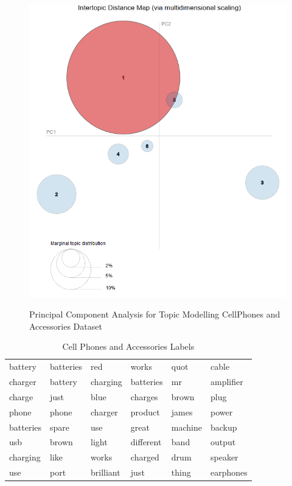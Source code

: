 \begin{figure}[H]
  {\includegraphics[width = 0.85 \textwidth]{img/lda/3.PNG}}
  \caption{Principal Component Analysis for Topic Modelling CellPhones and Accessories Dataset}
\end{figure}


\begin{table}[h]
\centering
\begin{tabular}{ llllll }
\midrule
battery & batteries & red & works  & quot & cable \\
charger & battery & charging & batteries  & mr & amplifier \\
charge & just & blue & charges & brown & plug \\ 
phone & phone & charger & product & james & power \\ 
batteries  & spare & use  & great & machine & backup \\ 
usb & brown & light & different  & band & output \\ 
charging & like & works & charged & drum & speaker \\ 
use & port & brilliant & just &  thing & earphones \\ 
\bottomrule          
\end{tabular}
\caption{Cell Phones and Accessories Labels}
\label{Cell Phones and Accessories Labels}
\end{table}

